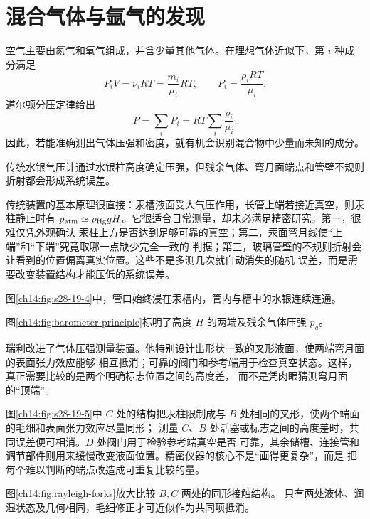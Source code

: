 {\section{混合气体与氩气的发现}\label{ch14:sec:mixtures}

空气主要由氮气和氧气组成，并含少量其他气体。在理想气体近似下，第 $i$ 种成分满足
\begin{equation}
  P_iV=\nu_iRT=\frac{m_i}{\mu_i}RT,
  \qquad
  P_i=\frac{\rho_iRT}{\mu_i}.
\end{equation}
道尔顿分压定律给出
\begin{equation}
  \boxed{P=\sum_iP_i=RT\sum_i\frac{\rho_i}{\mu_i}}.
\end{equation}
因此，若能准确测出气体压强和密度，就有机会识别混合物中少量而未知的成分。

传统水银气压计通过水银柱高度确定压强，但残余气体、弯月面端点和管壁不规则折射都会形成系统误差。

传统装置的基本原理很直接：汞槽液面受大气压作用，长管上端若接近真空，则汞柱静止时有
$p_{\rm atm}\simeq\rho_{\rm Hg}gH$。它很适合日常测量，却未必满足精密研究。第一，很难仅凭外观确认
汞柱上方是否达到足够可靠的真空；第二，汞面弯月线使“上端”和“下端”究竟取哪一点缺少完全一致的
判据；第三，玻璃管壁的不规则折射会让看到的位置偏离真实位置。这些不是多测几次就自动消失的随机
误差，而是需要改变装置结构才能压低的系统误差。

图\ref{ch14:fig:s28-19-4}中，管口始终浸在汞槽内，管内与槽中的水银连续连通。
\figureNineteenFourFaithful

图\ref{ch14:fig:barometer-principle}标明了高度 $H$ 的两端及残余气体压强 $p_g$。
\traditionalBarometerDiagram

瑞利改进了气体压强测量装置。他特别设计出形状一致的叉形液面，使两端弯月面的表面张力效应能够
相互抵消；可靠的阀门和参考端用于检查真空状态。这样，真正需要比较的是两个明确标志位置之间的高度差，
而不是凭肉眼猜测弯月面的“顶端”。

图\ref{ch14:fig:s28-19-5}中 $C$ 处的结构把汞柱限制成与 $B$ 处相同的叉形，使两个端面的毛细和表面张力效应尽量同形；
测量 $C$、$B$ 处活塞或标志之间的高度差时，共同误差便可相消。$D$ 处阀门用于检验参考端真空是否
可靠，其余储槽、连接管和调节部件则用来缓慢改变液面位置。精密仪器的核心不是“画得更复杂”，而是
把每个难以判断的端点改造成可重复比较的量。

\figureNineteenFiveFaithful

图\ref{ch14:fig:rayleigh-forks}放大比较 $B,C$ 两处的同形接触结构。
只有两处液体、润湿状态及几何相同，毛细修正才可近似作为共同项抵消。
\rayleighApparatusDiagram

}
